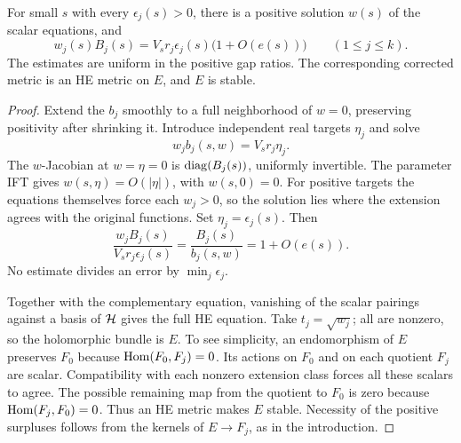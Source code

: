 \begin{proposition}\label{prop:balance}
For small $s$ with every $\epsilon_j(s)>0$, there is a positive
solution $w(s)$ of the scalar equations, and
\begin{equation}\label{eq:individual-balance}
 w_j(s)B_j(s)=V_sr_j\epsilon_j(s)\bigl(1+O(e(s))\bigr)
 \qquad(1\le j\le k).
\end{equation}
The estimates are uniform in the positive gap ratios. The corresponding
corrected metric is an HE metric on $E$, and $E$ is stable.
\end{proposition}

\begin{proof}
Extend the $b_j$ smoothly to a full neighborhood of $w=0$, preserving
positivity after shrinking it. Introduce independent real targets
$\eta_j$ and solve
\[
 w_jb_j(s,w)=V_sr_j\eta_j.
\]
The $w$-Jacobian at $w=\eta=0$ is $\operatorname{diag}(B_j(s))$, uniformly
invertible. The parameter IFT gives $w(s,\eta)=O(|\eta|)$,
with $w(s,0)=0$. For positive targets the equations themselves force
each $w_j>0$, so the solution lies where the extension agrees with
the original functions. Set $\eta_j=\epsilon_j(s)$. Then
\[
 \frac{w_jB_j(s)}{V_sr_j\epsilon_j(s)}
       =\frac{B_j(s)}{b_j(s,w)}=1+O(e(s)).
\]
No estimate divides an error by $\min_j\epsilon_j$.

Together with the complementary equation, vanishing of the scalar
pairings against a basis of $\mathcal H$ gives the full HE equation. Take
$t_j=\sqrt{w_j}$; all are nonzero, so the holomorphic bundle is $E$.
To see simplicity, an endomorphism of $E$ preserves $F_0$ because
$\operatorname{Hom}(F_0,F_j)=0$. Its actions on $F_0$ and on each quotient
$F_j$ are scalar. Compatibility with each nonzero extension class
forces all these scalars to agree. The possible remaining map from
the quotient to $F_0$ is zero because $\operatorname{Hom}(F_j,F_0)=0$.
Thus an HE metric makes $E$ stable. Necessity of the positive
surpluses follows from the kernels of $E\to F_j$, as in the introduction.
\end{proof}
